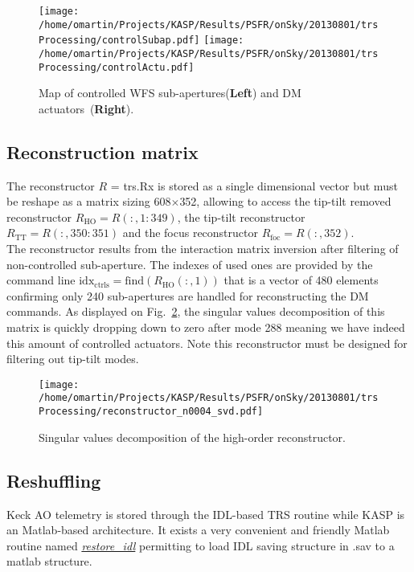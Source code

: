 \documentclass[12pt]{article}
\begin{document}
\begin{figure} [H] 
	\centering
	\texttt{[image: /home/omartin/Projects/KASP/Results/PSFR/onSky/20130801/trsProcessing/controlSubap.pdf]} \hspace{1cm}
	\texttt{[image: /home/omartin/Projects/KASP/Results/PSFR/onSky/20130801/trsProcessing/controlActu.pdf]}
	\caption{ Map of controlled WFS sub-apertures(\textbf{Left}) and DM actuators~(\textbf{Right}).}
	\label{F:ctrl}
\end{figure}

\subsection{Reconstruction matrix}

The reconstructor $R$ = trs.Rx is stored as a single dimensional vector but must be reshape as a matrix sizing 608$\times$352, allowing to access the tip-tilt removed reconstructor $R_\text{HO} = R(:,1:349)$, the tip-tilt reconstructor $R_\text{TT} = R(:,350:351)$ and the focus reconstructor $R_\text{foc} = R(:,352)$.\\ 

The reconstructor results from the interaction matrix inversion after filtering of non-controlled sub-aperture. The indexes of used ones are provided by the command line $\text{idx}_\text{ctrls} = \text{find}(R_\text{HO}(:,1))$ that is a vector of 480 elements confirming only 240 sub-apertures are handled for reconstructing the DM commands. As displayed on Fig.~\ref{F:reconstructor}, the singular values decomposition of this matrix is quickly dropping down to zero after mode 288 meaning we have indeed this amount of controlled actuators. Note this reconstructor must be designed for filtering out tip-tilt modes.

\begin{figure}[H] 
	\centering
		\texttt{[image: /home/omartin/Projects/KASP/Results/PSFR/onSky/20130801/trsProcessing/reconstructor\_n0004\_svd.pdf]}
		\caption{ Singular values decomposition of the high-order reconstructor.}
		\label{F:reconstructor}
\end{figure}

\subsection{Reshuffling}

Keck AO telemetry is stored through the IDL-based TRS routine while KASP is an Matlab-based architecture. It exists a very convenient and friendly Matlab routine named \href{https://fr.mathworks.com/matlabcentral/fileexchange/43899-restore-idl}{\emph{restore\_idl}} permitting to load IDL saving structure in .sav to a matlab structure.\\
\end{document}

